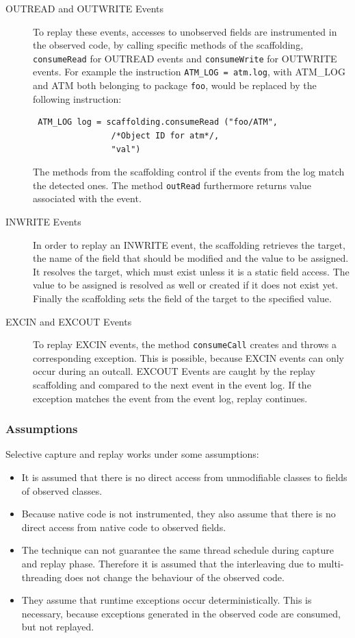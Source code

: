 \begin{description}
 \item [OUTREAD and OUTWRITE Events] To replay these events, accesses to unobserved fields are instrumented in the observed code, by calling specific methods of the scaffolding, \texttt{consumeRead} for OUTREAD events and \texttt{consumeWrite} for OUTWRITE events. For example the instruction \texttt{ATM\_LOG = atm.log}, with ATM\_LOG and ATM both belonging to package \texttt{foo}, would be replaced by the following instruction:
\begin{lstlisting}
 ATM_LOG log = scaffolding.consumeRead ("foo/ATM",
                /*Object ID for atm*/,
                "val")
\end{lstlisting}
The methods from the scaffolding control if the events from the log match the detected ones. The method \texttt{outRead} furthermore returns value associated with the event.
 \item [INWRITE Events] In order to replay an INWRITE event, the scaffolding retrieves the target, the name of the field that should be modified and the value to be assigned. It resolves the target, which must exist unless it is a static field access. The value to be assigned is resolved as well or created if it does not exist yet. Finally the scaffolding sets the field of the target to the specified value.
 \item [EXCIN and EXCOUT Events]  To replay EXCIN events, the method \texttt{consumeCall} creates and throws a corresponding exception. This is possible, because EXCIN events can only occur during an outcall. EXCOUT Events are caught by the replay scaffolding and compared to the next event in the event log. If the exception matches the event from the event log, replay continues.
\end{description}

\subsubsection{Assumptions}
Selective capture and replay works under some assumptions:
\begin{itemize}
 \item It is assumed that there is no direct access from unmodifiable classes to fields of observed classes.
 \item Because native code is not instrumented, they also assume that there is no direct access from native code to observed fields.
 \item The technique can not guarantee the same thread schedule during capture and replay phase. Therefore it is assumed that the interleaving due to multi-threading does not change the behaviour of the observed code.
 \item They assume that runtime exceptions occur deterministically. This is necessary, because exceptions generated in the observed code are consumed, but not replayed.
\end{itemize}

